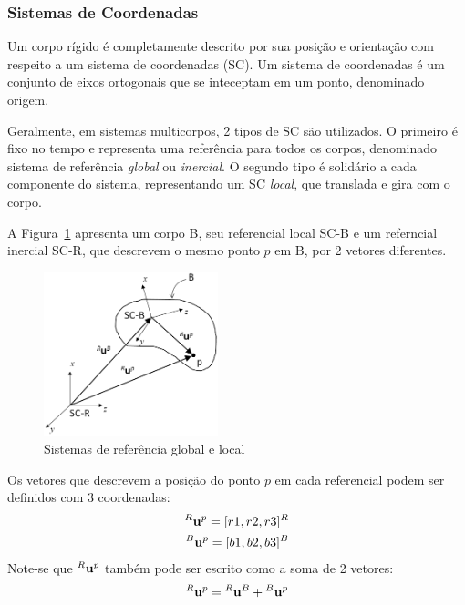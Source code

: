 \subsubsection{Sistemas de Coordenadas}

Um corpo rígido é completamente descrito por sua posição e orientação com
respeito a um sistema de coordenadas (SC). Um sistema de coordenadas é um
conjunto de eixos ortogonais que se inteceptam em um ponto, denominado origem.

Geralmente, em sistemas multicorpos, 2 tipos de SC são utilizados. O primeiro é
fixo no tempo e representa uma referência para todos os corpos, denominado
sistema de referência \emph{global} ou \emph{inercial}. O segundo tipo é
solidário a cada componente do sistema, representando um SC \emph{local}, que
translada e gira com o corpo.

A Figura~\ref{fig::sist_refs} apresenta um corpo B, seu referencial local SC-B e
um referncial inercial SC-R, que descrevem o mesmo ponto $p$ em B, por 2 vetores
diferentes.

\begin{figure}[h]
	\centering 
 	\includegraphics[width=0.45\textwidth]{figs/sist_refs}
 	\caption{Sistemas de referência global e local}
 	\label{fig::sist_refs}
\end{figure}

Os vetores que descrevem a posição do ponto $p$ em cada referencial podem ser
definidos com 3 coordenadas:
%
\begin{align}
	^{R}\textrm{\textbf{u}}^{p} = [r1, r2, r3]^{R} \\
	^{B}\textrm{\textbf{u}}^{p} = [b1, b2, b3]^{B}
\end{align}
%
Note-se que $^{R}\textrm{\textbf{u}}^{p}$ também pode ser escrito como a soma de
2 vetores:
%
\begin{equation}
	^{R}\textrm{\textbf{u}}^{p} = {}^{R}\textrm{\textbf{u}}^{B} + 
	{}^{B}\textrm{\textbf{u}}^{p}
\end{equation}
%


